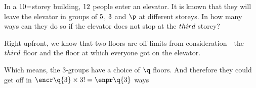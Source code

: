 

\EXPR[0]\p{(\vbtwo - (\vbthree + \vbfour))}
\SUBTRACT{}\q

\question In a $10-$storey building, $12$ people enter an elevator. 
It is known that they will leave the elevator in groups of 
$5$, $3$ and $\p$ at different storeys. In how many ways can they do 
so if the elevator does not stop at the $third$ storey?

\insertQR{}

\watchout[-1cm]

\ifprintanswers
\fi 

\begin{solution}
  Right upfront, we know that two floors are off-limits from consideration - the $third$ floor
  and the floor at which everyone got on the elevator. 

  Which means, the 3-groups have a choice of $\q$ floors. And therefore they could get off 
  in $\encr\q{3}\times 3! = \enpr\q{3}$ ways
\end{solution}

